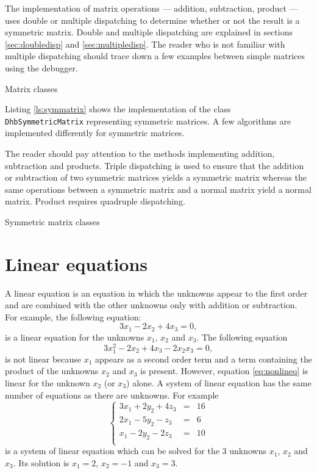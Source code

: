 \documentclass[twoside]{book}
\begin{document}
The implementation of matrix operations --- addition, subtraction,
product --- uses double or multiple dispatching to determine
whether or not the result is a symmetric matrix. Double and
multiple dispatching are explained in sections
\ref{sec:doubledisp} and \ref{sec:multipledisp}. The reader who is
not familiar with multiple dispatching should trace down a few
examples between simple matrices using the debugger.
\begin{listing} Matrix classes \label{ls:matrix}

\end{listing}
Listing \ref{ls:symmatrix} shows the implementation of the class
{\tt DhbSymmetricMatrix} representing symmetric matrices. A few
algorithms are implemented differently for symmetric matrices.

The reader should pay attention to the methods implementing
addition, subtraction and products. Triple dispatching is used to
ensure that the addition or subtraction of two symmetric matrices
yields a symmetric matrix whereas the same operations between a
symmetric matrix and a normal matrix yield a normal matrix.
Product requires quadruple dispatching.
\begin{listing} Symmetric matrix classes \label{ls:symmatrix}

\end{listing}




\section{Linear equations}
\label{sec:lineqs} A linear equation is an equation in which the
unknowns appear to the first order and are combined with the other
unknowns only with addition or subtraction. For example, the
following equation:
\begin{equation}
  3x_1-2x_2+4x_3=0,
\end{equation}
is a linear equation for the unknowns $x_1$, $x_2$ and $x_3$. The
following equation
\begin{equation}
\label{eq:nonlineq}
  3x_1^2-2x_2+4x_3 - 2 x_2 x_3=0,
\end{equation}
is not linear because $x_1$ appears as a second order term and a
term containing the product of the unknowns $x_2$ and $x_3$ is
present. However, equation \ref{eq:nonlineq} is linear for the
unknown $x_2$ (or $x_3$) alone. A system of linear equation has
the same number of equations as there are unknowns. For example
\begin{equation}
\label{eq:lineqex}
  \left\{
  \begin{array}{lcr}
  3x_1+2y_2+4z_3&=&16\\
  2x_1-5y_2-z_3&=&6\\
  x_1-2y_2-2z_3&=&10\\
\end{array}\right.
\end{equation}
is a system of linear equation which can be solved for the 3
unknowns $x_1$, $x_2$ and $x_3$. Its solution is $x_1=2$, $x_2=-1$
and $x_3=3$.
\end{document}
